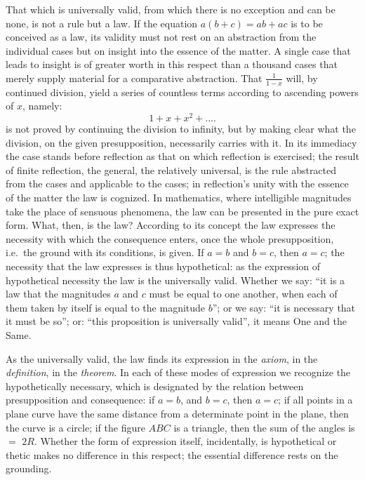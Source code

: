 \documentclass[12pt,a4paper,openany]{book}
\newcommand{\opage}[1]{\marginnote{\footnotesize\textit{[#1]}}}
\begin{document}
That which is universally valid, from which there is no exception and can be none, is not a rule but a law. If the equation
$a(b+c)=ab+ac$ is to be conceived as a law, its validity must not rest on an abstraction from the individual cases
but on insight into the essence of the matter. A single case that
leads to insight is of greater worth in this respect than
a thousand cases that merely supply material for a comparative
abstraction. That $\frac{1}{1-x}$ will, by continued division, yield a
series of countless terms according to ascending powers of $x$, namely:
\[ 1+x+x^{2}+.... \]
is not proved by continuing the division
to infinity, but by making clear what the division,
on the given presupposition, necessarily carries with it.
In its immediacy the case stands before reflection as
that on which reflection is exercised; the result of finite
reflection, the general, the relatively universal, is the rule abstracted from
the cases and applicable to the cases;
in reflection's unity with the essence of the matter the law is cognized.
In mathematics, where intelligible magnitudes take the place of
sensuous phenomena, the law can be presented in the pure
exact form. What, then, is the law? According to its concept
the law expresses the necessity with which the consequence enters,
once the whole presupposition, i.e.\ the ground with its conditions,
is given. If $a=b$ and $b=c$, then $a=c$; the
necessity that the law expresses is thus hypothetical: as
the expression of hypothetical necessity the law is the universally valid.
Whether we say: ``it is a law that the magnitudes $a$ and $c$ must be equal to one another, when each of them taken by itself
is equal to the magnitude $b$''; or we say: ``it is necessary
that it must be so''; or: ``this proposition is universally valid'', it means One and the Same.

As the universally valid, the law finds its expression in the \emph{axiom}, in the \emph{definition}, in the \emph{theorem}. In each of these
\setcounter{footnote}{0}%
\opage{17}modes of expression we recognize the hypothetically necessary, which is
designated by the relation between presupposition and consequence:
if $a=b$, and $b=c$, then $a=c$; if all
points in a plane curve have the same distance from a
determinate point in the plane, then the curve is a circle; if
the figure $ABC$ is a triangle, then the sum of the angles is $=$ $2R$. Whether the form of expression itself, incidentally, is hypothetical or
thetic makes no difference in this respect; the essential
difference rests on the grounding.
\end{document}
